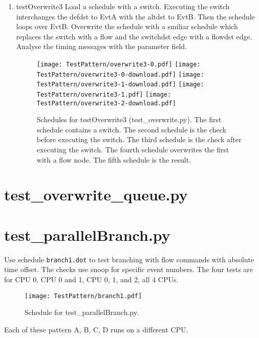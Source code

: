 \documentclass[12pt,a4paper]{report}
\begin{document}
\begin{enumerate}
\item testOverwrite3
    Load a schedule with a switch. Executing the switch interchanges
    the defdst to EvtA with the altdst to EvtB. Then the schedule loops
    over EvtB.
    Overwrite the schedule with a smiliar schedule which replaces the switch
    with a flow and the switchdst edge with a flowdst edge.
    Analyse the timing messages with the parameter field.
    \begin{figure}
        \centering
        \texttt{[image: TestPattern/overwrite3-0.pdf]}
        \texttt{[image: TestPattern/overwrite3-0-download.pdf]}
        \texttt{[image: TestPattern/overwrite3-1-download.pdf]}
        \texttt{[image: TestPattern/overwrite3-1.pdf]}
        \texttt{[image: TestPattern/overwrite3-2-download.pdf]}
        \caption{Schedules for testOverwrite3 (test\_overwrite.py). The first schedule
        contains a switch. The second schedule is the check before executing the
        switch. The third schedule is the check after executing the
        switch. The fourth schedule overwrites the first
        with a flow node. The fifth schedule is the result.}
        \label{fig:Schedules_for_testOverwrite3}
    \end{figure}

\end{enumerate}

\section{test\_overwrite\_queue.py}

\section{test\_parallelBranch.py}
Use schedule \texttt{branch1.dot} to test branching with flow commands
with absolute time offset. The checks use snoop for specific event numbers.
The four tests are for CPU 0, CPU 0 and 1, CPU 0, 1, and 2, all 4 CPUs.
    \begin{figure}
        \centering
        \texttt{[image: TestPattern/branch1.pdf]}
        \caption{Schedule for test\_parallelBranch.py.}
        \label{fig:Pattern_for_test_parallelBranch}
    \end{figure}
    Each of these pattern A, B, C, D runs on a different CPU.
\end{document}

